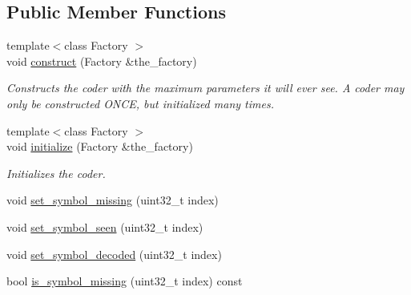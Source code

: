 \subsection*{Public Member Functions}
\begin{DoxyCompactItemize}
\item 
{\footnotesize template$<$class Factory $>$ }\\void \hyperlink{classkodo_1_1symbol__decoding__status__tracker_a50d166084e7f938605ed64fcea10de87}{construct} (Factory \&the\-\_\-factory)
\begin{DoxyCompactList}\small\item\em Constructs the coder with the maximum parameters it will ever see. A coder may only be constructed O\-N\-C\-E, but initialized many times. \end{DoxyCompactList}\item 
{\footnotesize template$<$class Factory $>$ }\\void \hyperlink{classkodo_1_1symbol__decoding__status__tracker_a866331573cff3fb0d8dd2f659f71e25b}{initialize} (Factory \&the\-\_\-factory)
\begin{DoxyCompactList}\small\item\em Initializes the coder. \end{DoxyCompactList}\item 
void \hyperlink{classkodo_1_1symbol__decoding__status__tracker_aec7dea9960658a83201b893a485db94e}{set\-\_\-symbol\-\_\-missing} (uint32\-\_\-t index)
\begin{DoxyCompactList}\small\item\em \end{DoxyCompactList}\item 
void \hyperlink{classkodo_1_1symbol__decoding__status__tracker_a4960cb8fa0c98bd1d97003f5ef1c79e8}{set\-\_\-symbol\-\_\-seen} (uint32\-\_\-t index)
\begin{DoxyCompactList}\small\item\em \end{DoxyCompactList}\item 
void \hyperlink{classkodo_1_1symbol__decoding__status__tracker_a6af1cd773b9f8e657e7de49523a1f8b2}{set\-\_\-symbol\-\_\-decoded} (uint32\-\_\-t index)
\begin{DoxyCompactList}\small\item\em \end{DoxyCompactList}\item 
bool \hyperlink{classkodo_1_1symbol__decoding__status__tracker_abe98ed425246aafb6546bbb16100b78e}{is\-\_\-symbol\-\_\-missing} (uint32\-\_\-t index) const 

\end{DoxyCompactItemize}
